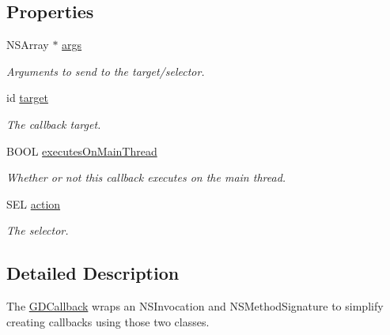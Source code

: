 \subsection*{Properties}
\begin{DoxyCompactItemize}
\item 
NSArray $\ast$ \hyperlink{interface_g_d_callback_a96dccd3a137501fccc5465f088330df1}{args}
\begin{DoxyCompactList}\small\item\em Arguments to send to the target/selector. \item\end{DoxyCompactList}\item 
\hypertarget{interface_g_d_callback_a9eacabccf60b055b82863379ba975d98}{
id \hyperlink{interface_g_d_callback_a9eacabccf60b055b82863379ba975d98}{target}}
\label{interface_g_d_callback_a9eacabccf60b055b82863379ba975d98}

\begin{DoxyCompactList}\small\item\em The callback target. \item\end{DoxyCompactList}\item 
\hypertarget{interface_g_d_callback_aa8d10c06e2d114d717f5ef94f589a053}{
BOOL \hyperlink{interface_g_d_callback_aa8d10c06e2d114d717f5ef94f589a053}{executesOnMainThread}}
\label{interface_g_d_callback_aa8d10c06e2d114d717f5ef94f589a053}

\begin{DoxyCompactList}\small\item\em Whether or not this callback executes on the main thread. \item\end{DoxyCompactList}\item 
\hypertarget{interface_g_d_callback_aaecc54f9a928ff69fce347c80734726e}{
SEL \hyperlink{interface_g_d_callback_aaecc54f9a928ff69fce347c80734726e}{action}}
\label{interface_g_d_callback_aaecc54f9a928ff69fce347c80734726e}

\begin{DoxyCompactList}\small\item\em The selector. \item\end{DoxyCompactList}\end{DoxyCompactItemize}


\subsection{Detailed Description}
The \hyperlink{interface_g_d_callback}{GDCallback} wraps an NSInvocation and NSMethodSignature to simplify creating callbacks using those two classes. 

